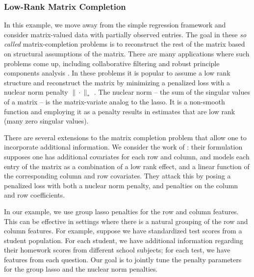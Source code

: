\documentclass[12pt]{article}
\begin{document}
\subsubsection{Low-Rank Matrix Completion}\label{sec:matrix_completion}

In this example, we move away from the simple regression framework and consider matrix-valued data with partially observed entries. The goal in these \emph{so called} matrix-completion problems is to reconstruct the rest of the matrix based on structural assumptions of the matrix. There are many applications where such problems come up, including collaborative filtering \citet{netflix} and robust principle components analysis \citet{candes2011robust}. 
In these problems it is popular to assume a low rank structure and reconstruct the matrix by minimizing a penalized loss with a nuclear norm penalty $\|\cdot \|_*$ \citep{fazel2002matrix, srebro2004learning}. The nuclear norm -- the sum of the singular values of a matrix -- is the matrix-variate analog to the lasso. It is a non-smooth function and employing it as a penalty results in estimates that are low rank (many zero singular values).

There are several extensions to the matrix completion problem that allow one to incorporate additional information. We consider the work of \citet{fithian2013scalable}: their formulation supposes one has additional covariates for each row and column, and models each entry of the matrix as a combination of a low rank effect, and a linear function of the corresponding column and row covariates. They attack this by posing a penalized loss with both a nuclear norm penalty, and penalties on the column and row coefficients. 

In our example, we use group lasso penalties for the row and column features. This can be effective in settings where there is a natural grouping of the row and column features. For example, suppose we have standardized test scores from a student population. For each student, we have additional information regarding their homework scores from different school subjects; for each test, we have features from each question. Our goal is to jointly tune the penalty parameters for the group lasso and the nuclear norm penalties.
\end{document}

